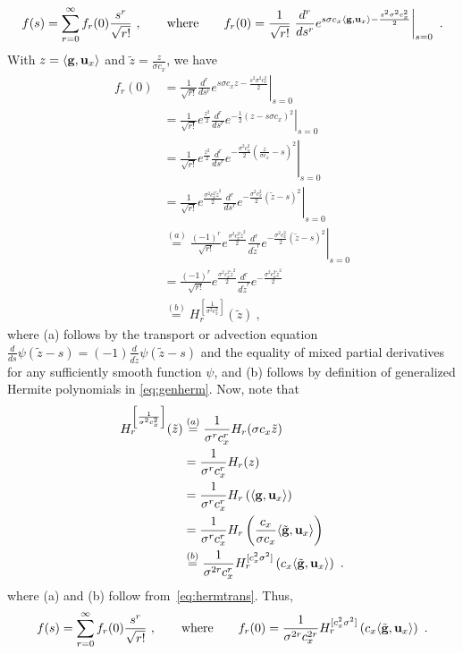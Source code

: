 \begin{align}
f(s) = \sum_{r=0}^{\infty} f_r(0) \frac{s^r}{\sqrt{r!}}~, \qquad \text{where} \qquad f_r(0) = \frac{1}{\sqrt{r!}} \left. \frac{d^r}{ds^r} e^{s \sigma c_x \langle \mathbf{g}, \mathbf{u}_x \rangle - \frac{s^2\sigma^2 c_x^2}{2}  } \right|_{s=0}~.
\end{align}
With $z = \langle \mathbf{g}, \mathbf{u}_x \rangle$ and $\tilde{z} = \frac{z}{\sigma c_x}$, we have 
\begin{align*}
f_r(0) & = \frac{1}{\sqrt{r!}} \left. \frac{d^r}{ds^r} e^{s \sigma c_x z - \frac{s^2\sigma^2 c_x^2}{2}  } \right|_{s=0}  \\
& = \frac{1}{\sqrt{r!}} \left. e^{\frac{z^2}{2}} \frac{d^r}{d s^r} e^{-\frac{1}{2} (z - s \sigma c_x)^2} \right|_{s=0} \\
& = \frac{1}{\sqrt{r!}} \left. e^{\frac{z^2}{2}} \frac{d^r}{d s^r} e^{-\frac{\sigma^2 c_x^2}{2} \left( \frac{z}{\sigma c_x} - s \right)^2} \right|_{s=0} \\
& = \frac{1}{\sqrt{r!}} \left. e^{\frac{\sigma^2 c_x^2 \tilde{z}^2}{2}} \frac{d^r}{d s^r} e^{-\frac{\sigma^2 c_x^2}{2} ( \tilde{z} - s )^2} \right|_{s=0} \\
& \overset{(a)}{=} \frac{(-1)^r}{\sqrt{r!}} \left. e^{\frac{\sigma^2 c_x^2 \tilde{z}^2}{2}} \frac{d^r}{d {\tilde{z}}^r} e^{-\frac{\sigma^2 c_x^2}{2} ( \tilde{z} - s )^2} \right|_{s=0} \\
& = \frac{(-1)^r}{\sqrt{r!}} e^{\frac{\sigma^2 c_x^2 \tilde{z}^2}{2}} \frac{d^r}{d {\tilde{z}}^r} e^{-\frac{\sigma^2 c_x^2 \tilde{z}^2}{2}}  \\
& \overset{(b)}{=} H^{\left[\frac{1}{\sigma^2 c_x^2}\right]}_r(\tilde{z})~,
\end{align*}
where (a) follows by the transport or advection equation $\frac{d}{ds} \psi(\tilde{z} - s) = (-1) \frac{d}{d \tilde{z}} \psi(\tilde{z}-s)$ and the equality of mixed partial derivatives for any sufficiently smooth function $\psi$, and (b) follows by definition of generalized Hermite polynomials in \eqref{eq:genherm}. Now, note that
\begin{align*}
H^{\left[\frac{1}{\sigma^2 c_x^2}\right]}_r(\tilde{z}) & \overset{(a)}{=} \frac{1}{\sigma^r c_x^r} H_r(\sigma c_x \tilde{z}) \\
& = \frac{1}{\sigma^r c_x^r} H_r(z) \\
& = \frac{1}{\sigma^r c_x^r} H_r\left( \langle \mathbf{g}, \mathbf{u}_x\rangle \right) \\
& = \frac{1}{\sigma^r c_x^r} H_r\left( \frac{c_x}{\sigma c_x} \langle \tilde{\mathbf{g}}, \mathbf{u}_x \rangle \right) \\
& \overset{(b)}{=} \frac{1}{\sigma^{2r} c_x^{r}} H^{[c_x^2\sigma^2]}_r\left(c_x \langle \tilde{\mathbf{g}}, \mathbf{u}_x\rangle \right)~.
\end{align*}
where (a) and (b) follow from~\eqref{eq:hermtrans}. Thus,
\begin{align}
f(s) = \sum_{r=0}^{\infty} f_r(0) \frac{s^r}{\sqrt{r!}}~, \qquad \text{where} \qquad f_r(0) 
= \frac{1}{\sigma^{2r} c_x^{2r}} H^{[c_x^2 \sigma^2]}_r\left( c_x \langle \tilde{\mathbf{g}}, \mathbf{u}_x\rangle \right)~.
\end{align}

